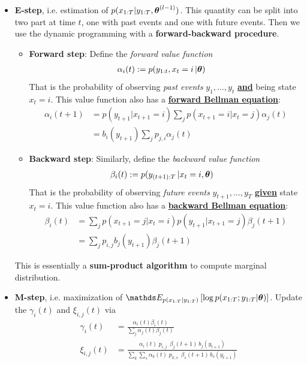 \documentclass[11pt]{article}
\begin{document}
\begin{itemize}
\begin{itemize}
\item \textbf{E-step}, i.e. estimation of $p(x_{1:T} |  y_{1:T}, \boldsymbol{\theta}^{(l-1)})$. This quantity can be split into two part at time $t$, one with past events and one with future events. Then we use the dynamic programming with a \textbf{forward-backward procedure}.
\begin{itemize}
\item \textbf{Forward step}: Define the \emph{forward value function} 
\begin{align}
\alpha_{i}(t) &:= p(y_{1:t}, x_t=i \,| \boldsymbol{\theta})   \label{eqn: hmm_baum_welch_alpha}
\end{align} That is the probability of observing \emph{past events} $y_{1},\ldots,  y_{t}$ \underline{\textbf{and}} being state $x_t=i$. This value function also has a \underline{\textbf{forward Bellman equation}}:
\begin{align}
\alpha_{i}(t+1) &= p(y_{t+1} | x_{t+1}=i)\sum_{j}p(x_{t+1} = i | x_{t}= j)\alpha_{j}(t)  \label{eqn: hmm_baum_welch_bellman}\\
&= b_{i}(y_{t+1})\sum_{j}p_{j,i}\alpha_{j}(t)  \nonumber
\end{align}

\item \textbf{Backward step}: Similarly, define the \emph{backward value function} 
\begin{align}
\beta_{i}(t) &:= p(y_{(t+1):T}\,|x_t=i, \boldsymbol{\theta})   \label{eqn: hmm_baum_welch_alpha}
\end{align} That is the probability of observing \emph{future} \emph{events} $y_{t+1},\ldots,  y_{T}$ \underline{\textbf{given}} state $x_t=i$. This value function also has a \underline{\textbf{backward Bellman equation}}:
\begin{align}
\beta_{i}(t) &= \sum_{j}p(x_{t+1} = j | x_{t}= i)p(y_{t+1} | x_{t+1}=j)\beta_{j}(t+1)  \label{eqn: hmm_baum_welch_bellman}\\
&= \sum_{j}p_{i,j}b_{j}(y_{t+1}) \beta_{j}(t+1) \nonumber
\end{align}
\end{itemize} This is essentially a \textbf{sum-product algorithm} to compute marginal distribution.

\item \textbf{M-step}, i.e. maximization of $\E{p(x_{1:T} |  y_{1:T})}{\log p(x_{1:T} ; y_{1:T} | \mb{\theta})}$. Update the $\gamma_{i}(t)$ and $\xi_{i,j}(t)$ via
\begin{align}
\gamma_{i}(t) &= \frac{\alpha_{i}(t)\beta_{i}(t)}{\sum_{j}\alpha_{j}(t)\beta_{j}(t)} \label{eqn: emission_update_local}\\
\xi_{i,j}(t) &= \frac{\alpha_i(t)\; p_{i, j}\, \;\beta_{j}(t+1)\,b_{j}(y_{t+1}) }{\sum_{k}\sum_{s}\alpha_k(t)\; p_{k, s}\, \;\beta_{s}(t+1)\,b_{s}(y_{t+1})}  \label{eqn: transition_update_local}
\end{align} 


\end{itemize}
\end{itemize}
\end{document}
